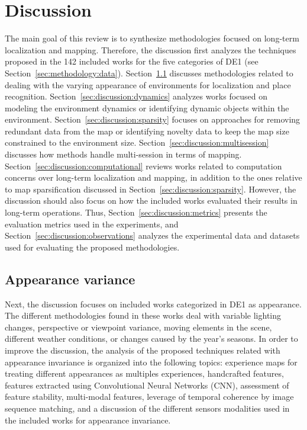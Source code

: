 \section{Discussion}
\label{sec:discussion}

The main goal of this review is to synthesize methodologies focused on long-term localization and mapping. Therefore, the discussion first analyzes the techniques proposed in the 142 included works for the five categories of DE1 (see Section~\ref{sec:methodology:data}). Section~\ref{sec:discussion:appearance} discusses methodologies related to dealing with the varying appearance of environments for localization and place recognition. Section~\ref{sec:discussion:dynamics} analyzes works focused on modeling the environment dynamics or identifying dynamic objects within the environment. Section~\ref{sec:discussion:sparsity} focuses on approaches for removing redundant data from the map or identifying novelty data to keep the map size constrained to the environment size. Section~\ref{sec:discussion:multisession} discusses how methods handle multi-session in terms of mapping. Section~\ref{sec:discussion:computational} reviews works related to computation concerns over long-term localization and mapping, in addition to the ones relative to map sparsification discussed in Section~\ref{sec:discussion:sparsity}. However, the discussion should also focus on how the included works evaluated their results in long-term operations. Thus, Section~\ref{sec:discussion:metrics} presents the evaluation metrics used in the experiments, and Section~\ref{sec:discussion:observations} analyzes the experimental data and datasets used for evaluating the proposed methodologies.





\subsection{Appearance variance}
\label{sec:discussion:appearance}

Next, the discussion focuses on included works categorized in DE1 as appearance. The different methodologies found in these works deal with variable lighting changes, perspective or viewpoint variance, moving elements in the scene, different weather conditions, or changes caused by the year's seasons.
In order to improve the discussion, the analysis of the proposed techniques related with appearance invariance is organized into the following topics: experience maps for treating different appearances as multiples experiences, handcrafted features, features extracted using Convolutional Neural Networks (CNN), assessment of feature stability, multi-modal features, leverage of temporal coherence by image sequence matching, and a discussion of the different sensors modalities used in the included works for appearance invariance.




